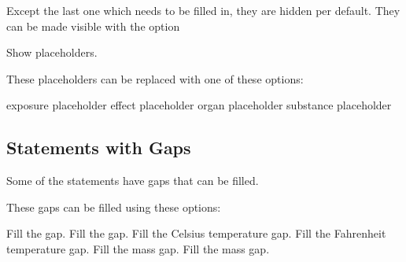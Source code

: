 \documentclass{ghsystem-manual}
\begin{document}
Except the last one which needs to be filled in, they are hidden per default.
They can be made visible with the option
\begin{options}
    Show placeholders.
\end{options}
\begin{example}
   \par
   \par
   \par
   \par
   \par
   \par
   \par
\end{example}

These placeholders can be replaced with one of these options:
\begin{options}
  \Default
    exposure placeholder
  \Default
    effect placeholder
  \Default
    organ placeholder
  \Default
    substance placeholder
\end{options}
\begin{example}
   \par
   \par
   \par
\end{example}

\subsection{Statements with Gaps}
Some of the statements have gaps that can be filled.
\begin{example}
   \par
   \par
   \par
\end{example}

These gaps can be filled using these options:
\begin{options}
    Fill the  gap.
    Fill the  gap.
    Fill the Celsius temperature gap.
    Fill the Fahrenheit temperature gap.
    Fill the \si{\GHSkilogram} mass gap.
    Fill the \si{\GHSpounds} mass gap.
\end{options}
\begin{example}
   \par
   \par
   \par
\end{example}
\end{document}
